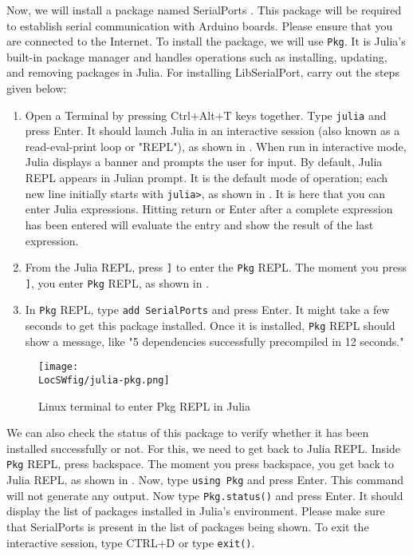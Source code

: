 Now, we will install a package named SerialPorts \cite{julia-serial-ports}. This package will be required to 
establish serial communication with Arduino boards. Please ensure that you 
are connected to the Internet. To install the package,  
we will use {\tt Pkg}. It is Julia's built-in package manager and 
handles operations such as installing, updating, and removing packages in Julia. 
For installing LibSerialPort, carry out the steps given below:
\begin{enumerate}
      \item Open a Terminal by pressing Ctrl+Alt+T keys together. Type {\tt julia} and press Enter.
      It should launch Julia in an interactive session (also known as a read-eval-print loop or "REPL"), as shown 
      in . When run in interactive mode, Julia displays a banner and 
      prompts the user for input. By default, Julia REPL appears in Julian prompt. It is the default mode of 
      operation; each new line initially starts with {\tt julia>}, as 
      shown in . It is here that you can enter Julia expressions. 
      Hitting return or Enter after a complete expression has been entered will evaluate 
      the entry and show the result of the last expression.  
      \item From the Julia REPL, press {\tt ]} to enter the {\tt Pkg} REPL. The moment you press 
            {\tt ]}, you enter {\tt Pkg} REPL, as shown in . 
      \item In {\tt Pkg} REPL, type {\tt add SerialPorts} and press Enter. It might take a few seconds  
            to get this package installed. Once it is installed, {\tt Pkg} REPL should show a message,
            like "5 dependencies successfully precompiled in 12 seconds." 
\end{enumerate}

\begin{figure}
      \centering
      \texttt{[image: \\LocSWfig/julia-pkg.png]}
      \caption{Linux terminal to enter Pkg REPL in Julia}
      \label{julia-pkg}
\end{figure}

We can also check the status of this package to verify whether it has been installed 
successfully or not. For this, we need to get back to Julia REPL. Inside {\tt Pkg}
REPL, press backspace. The moment you press backspace, you get back to Julia REPL, as shown in 
. Now, type {\tt using Pkg} and press Enter. This command will not 
generate any output. Now type {\tt Pkg.status()} and press Enter. It should display the 
list of packages installed in Julia's environment. Please make sure that SerialPorts 
is present in the list of packages being shown. To exit the interactive session, type CTRL+D or type {\tt exit()}. 


